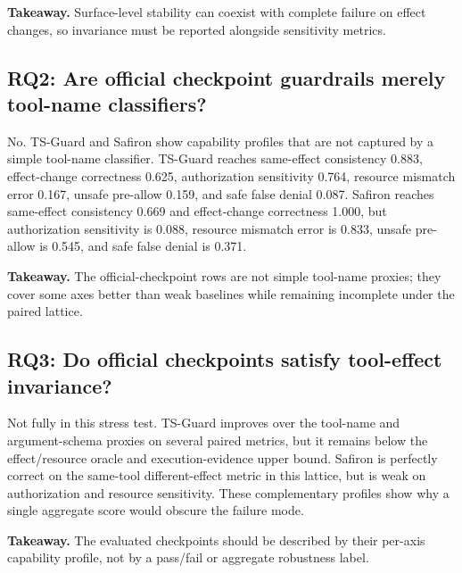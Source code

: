 \documentclass[11pt]{article}
\begin{document}
\textbf{Takeaway.} Surface-level stability can coexist with complete failure on effect changes, so invariance must be reported alongside sensitivity metrics.

\subsection{RQ2: Are official checkpoint guardrails merely tool-name classifiers?}
No. TS-Guard and Safiron show capability profiles that are not captured by a simple tool-name classifier. TS-Guard reaches same-effect consistency 0.883, effect-change correctness 0.625, authorization sensitivity 0.764, resource mismatch error 0.167, unsafe pre-allow 0.159, and safe false denial 0.087. Safiron reaches same-effect consistency 0.669 and effect-change correctness 1.000, but authorization sensitivity is 0.088, resource mismatch error is 0.833, unsafe pre-allow is 0.545, and safe false denial is 0.371.

\textbf{Takeaway.} The official-checkpoint rows are not simple tool-name proxies; they cover some axes better than weak baselines while remaining incomplete under the paired lattice.

\subsection{RQ3: Do official checkpoints satisfy tool-effect invariance?}
Not fully in this stress test. TS-Guard improves over the tool-name and argument-schema proxies on several paired metrics, but it remains below the effect/resource oracle and execution-evidence upper bound. Safiron is perfectly correct on the same-tool different-effect metric in this lattice, but is weak on authorization and resource sensitivity. These complementary profiles show why a single aggregate score would obscure the failure mode.

\textbf{Takeaway.} The evaluated checkpoints should be described by their per-axis capability profile, not by a pass/fail or aggregate robustness label.
\end{document}
